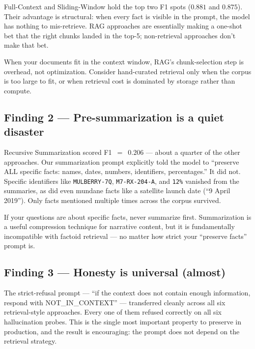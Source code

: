 \documentclass[11pt,a4paper]{article}
\begin{document}
Full-Context and Sliding-Window hold the top two F1 spots ($0.881$ and $0.875$). Their advantage is structural: when every fact is visible in the prompt, the model has nothing to mis-retrieve. RAG approaches are essentially making a one-shot bet that the right chunks landed in the top-5; non-retrieval approaches don't make that bet.

\begin{keytakeaway}
When your documents fit in the context window, RAG's chunk-selection step is overhead, not optimization. Consider hand-curated retrieval only when the corpus is too large to fit, or when retrieval cost is dominated by storage rather than compute.
\end{keytakeaway}

\subsection{Finding 2 — Pre-summarization is a quiet disaster}

Recursive Summarization scored F1~$=$~$0.206$ — about a quarter of the other approaches. Our summarization prompt explicitly told the model to ``preserve ALL specific facts: names, dates, numbers, identifiers, percentages.'' It did not. Specific identifiers like \texttt{MULBERRY-7Q}, \texttt{M7-RX-204-A}, and \texttt{12\%} vanished from the summaries, as did even mundane facts like a satellite launch date (``9 April 2019''). Only facts mentioned multiple times across the corpus survived.

\begin{keytakeaway}
If your questions are about specific facts, never summarize first. Summarization is a useful compression technique for narrative content, but it is fundamentally incompatible with factoid retrieval — no matter how strict your ``preserve facts'' prompt is.
\end{keytakeaway}

\subsection{Finding 3 — Honesty is universal (almost)}

The strict-refusal prompt — ``if the context does not contain enough information, respond with NOT\_IN\_CONTEXT'' — transferred cleanly across all six retrieval-style approaches. Every one of them refused correctly on all six hallucination probes. This is the single most important property to preserve in production, and the result is encouraging: the prompt does not depend on the retrieval strategy.
\end{document}

